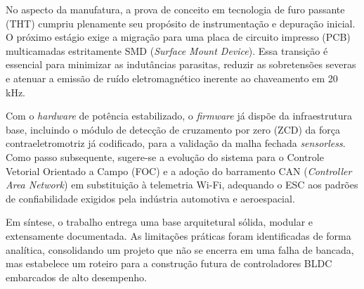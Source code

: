 No aspecto da manufatura, a prova de conceito em tecnologia de furo passante (THT) cumpriu plenamente seu propósito de instrumentação e depuração inicial. O próximo estágio exige a migração para uma placa de circuito impresso (PCB) multicamadas estritamente SMD (\textit{Surface Mount Device}). Essa transição é essencial para minimizar as indutâncias parasitas, reduzir as sobretensões severas e atenuar a emissão de ruído eletromagnético inerente ao chaveamento em 20 kHz.

Com o \textit{hardware} de potência estabilizado, o \textit{firmware} já dispõe da infraestrutura base, incluindo o módulo de detecção de cruzamento por zero (ZCD) da força contraeletromotriz já codificado, para a validação da malha fechada \textit{sensorless}. Como passo subsequente, sugere-se a evolução do sistema para o Controle Vetorial Orientado a Campo (FOC) e a adoção do barramento CAN (\textit{Controller Area Network}) em substituição à telemetria Wi-Fi, adequando o ESC aos padrões de confiabilidade exigidos pela indústria automotiva e aeroespacial.

Em síntese, o trabalho entrega uma base arquitetural sólida, modular e extensamente documentada. As limitações práticas foram identificadas de forma analítica, consolidando um projeto que não se encerra em uma falha de bancada, mas estabelece um roteiro para a construção futura de controladores BLDC embarcados de alto desempenho.